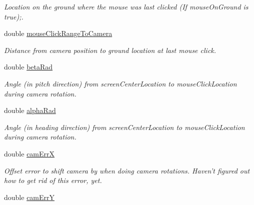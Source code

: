 \begin{DoxyCompactItemize}
\begin{DoxyCompactList}\small\item\em Location on the ground where the mouse was last clicked (If mouseOnGround is true);. \end{DoxyCompactList}\item 
\hypertarget{class_viewer3_d_ae61b63fd84e5ece6391a9dfb6e9c063a}{
double \hyperlink{class_viewer3_d_ae61b63fd84e5ece6391a9dfb6e9c063a}{mouseClickRangeToCamera}}
\label{class_viewer3_d_ae61b63fd84e5ece6391a9dfb6e9c063a}

\begin{DoxyCompactList}\small\item\em Distance from camera position to ground location at last mouse click. \end{DoxyCompactList}\item 
\hypertarget{class_viewer3_d_a2ef6ff8b107f56e4216278af6c3d8f4e}{
double \hyperlink{class_viewer3_d_a2ef6ff8b107f56e4216278af6c3d8f4e}{betaRad}}
\label{class_viewer3_d_a2ef6ff8b107f56e4216278af6c3d8f4e}

\begin{DoxyCompactList}\small\item\em Angle (in pitch direction) from screenCenterLocation to mouseClickLocation during camera rotation. \end{DoxyCompactList}\item 
\hypertarget{class_viewer3_d_a89d3c1011f9b54e4350fcaa012017c89}{
double \hyperlink{class_viewer3_d_a89d3c1011f9b54e4350fcaa012017c89}{alphaRad}}
\label{class_viewer3_d_a89d3c1011f9b54e4350fcaa012017c89}

\begin{DoxyCompactList}\small\item\em Angle (in heading direction) from screenCenterLocation to mouseClickLocation during camera rotation. \end{DoxyCompactList}\item 
\hypertarget{class_viewer3_d_a450a78aea3bf01be01dab894e599e968}{
double \hyperlink{class_viewer3_d_a450a78aea3bf01be01dab894e599e968}{camErrX}}
\label{class_viewer3_d_a450a78aea3bf01be01dab894e599e968}

\begin{DoxyCompactList}\small\item\em Offset error to shift camera by when doing camera rotations. Haven't figured out how to get rid of this error, yet. \end{DoxyCompactList}\item 
\hypertarget{class_viewer3_d_aa3100ee7017689cd3c9f946cf50f248d}{
double \hyperlink{class_viewer3_d_aa3100ee7017689cd3c9f946cf50f248d}{camErrY}}
\label{class_viewer3_d_aa3100ee7017689cd3c9f946cf50f248d}


\end{DoxyCompactItemize}
